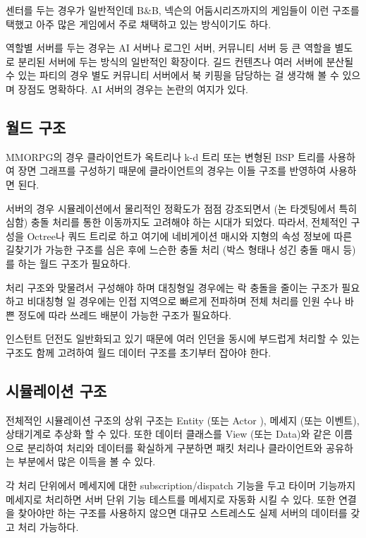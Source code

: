 \documentclass[chapter,kosection, 10.5pt, romanfixed, a4paper]{oblivoir}
\begin{document}
센터를 두는 경우가 일반적인데 B\&B, 넥슨의 어둠시리즈까지의 게임들이 
이런 구조를 택했고 아주 많은 게임에서 주로 채택하고 있는 방식이기도 하다. 

역할별 서버를 두는 경우는 AI 서버나 로그인 서버, 커뮤니티 서버 등 큰 역할을
별도로 분리된 서버에 두는 방식의 일반적인 확장이다. 길드 컨텐츠나 여러 서버에
분산될 수 있는 파티의 경우 별도 커뮤니티 서버에서 북 키핑을 담당하는 걸 생각해 
볼 수 있으며 장점도 명확하다. AI 서버의 경우는 논란의 여지가 있다. 

\subsection{월드 구조}

MMORPG의 경우 클라이언트가 옥트리나 k-d 트리 또는 변형된 BSP 트리를 사용하여 
장면 그래프를 구성하기 때문에 클라이언트의 경우는 이들 구조를 반영하여 사용하면 된다. 

서버의 경우 시뮬레이션에서 물리적인 정확도가 점점 강조되면서 (논 타겟팅에서 특히 심함) 
충돌 처리를 통한 이동까지도 고려해야 하는 시대가 되었다. 따라서, 전체적인 구성을 
Octree나 쿼드 트리로 하고 여기에 네비게이션 매시와 지형의 속성 정보에 따른 길찾기가 
가능한 구조를 심은 후에 느슨한 충돌 처리 (박스 형태나 성긴 충돌 매시 등)를 하는 월드 
구조가 필요하다. 

처리 구조와 맞물려서 구성해야 하며 대칭형일 경우에는 락 충돌을 줄이는 구조가 필요하고
비대칭형 일 경우에는 인접 지역으로 빠르게 전파하며 전체 처리를 인원 수나 바쁜 정도에 
따라 쓰레드 배분이 가능한 구조가 필요하다. 

인스턴트 던전도 일반화되고 있기 때문에 여러 인던을 동시에 부드럽게 처리할 수 있는 구조도 
함께 고려하여 월드 데이터 구조를 초기부터 잡아야 한다. 

\subsection{시뮬레이션 구조}

전체적인 시뮬레이션 구조의 상위 구조는 Entity (또는 Actor ), 메세지 (또는 이벤트), 상태기계로
추상화 할 수 있다. 또한 데이터 클래스를 View (또는 Data)와 같은 이름으로 분리하여 처리와 
데이터를 확실하게 구분하면 패킷 처리나 클라이언트와 공유하는 부분에서 많은 이득을 볼 수 있다. 

각 처리 단위에서 메세지에 대한 subscription/dispatch 기능을 두고 타이머 기능까지 메세지로 
처리하면 서버 단위 기능 테스트를 메세지로 자동화 시킬 수 있다. 또한 연결을 찾아야만 하는 
구조를 사용하지 않으면 대규모 스트레스도 실제 서버의 데이터를 갖고 처리 가능하다. 
\end{document}
